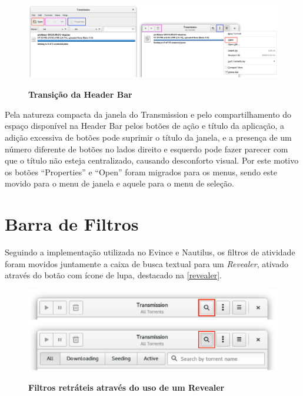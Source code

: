 \begin{figure}[!ht]
  \begin{center}
    \caption{\textbf{Transição da Header Bar}}
    \includegraphics [width=\textwidth]{image/header-bar-transition.eps}
    \label{header-bar-transition}
  \end{center}
\end{figure}

Pela natureza compacta da janela do Transmission e pelo compartilhamento do
espaço disponível na Header Bar pelos botões de ação e título da aplicação, a
adição excessiva de botões pode suprimir o título da janela, e a presença de um
número diferente de botões no lados direito e esquerdo pode fazer parecer com
que o título não esteja centralizado, causando desconforto visual. Por este
motivo os botões ``Properties'' e ``Open'' foram migrados para os menus, sendo
este movido para o menu de janela e aquele para o menu de seleção.

\section{Barra de Filtros}

Seguindo a implementação utilizada no Evince e Nautilus, os filtros de atividade
foram movidos juntamente a caixa de busca textual para um \textit{Revealer},
ativado através do botão com ícone de lupa, destacado na \autoref{revealer}.

\begin{figure}[!h]
  \begin{center}
    \caption{\textbf{Filtros retráteis através do uso de um Revealer}}
    \includegraphics [width=\textwidth]{image/revealer.eps}
    \label{revealer}
  \end{center}
\end{figure}

